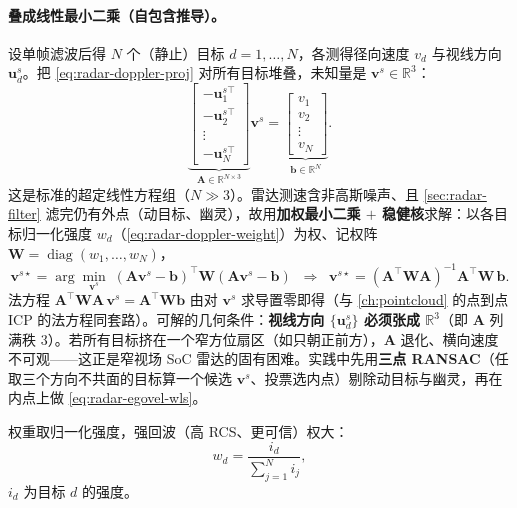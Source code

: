\paragraph{叠成线性最小二乘（自包含推导）。}
设单帧滤波后得 $N$ 个（静止）目标 $d=1,\dots,N$，各测得径向速度 $v_d$ 与视线方向 $\mathbf u_d^s$。把 \cref{eq:radar-doppler-proj} 对所有目标堆叠，未知量是 $\mathbf v^s\in\mathbb R^3$：
\begin{equation}
  \underbrace{\begin{bmatrix} -\mathbf u_1^{s\top}\\ -\mathbf u_2^{s\top}\\ \vdots\\ -\mathbf u_N^{s\top}\end{bmatrix}}_{\mathbf A\in\mathbb R^{N\times3}}\mathbf v^s
  =\underbrace{\begin{bmatrix} v_1\\ v_2\\ \vdots\\ v_N\end{bmatrix}}_{\mathbf b\in\mathbb R^{N}}.
  \label{eq:radar-egovel-stack}
\end{equation}
这是标准的超定线性方程组（$N\gg3$）。雷达测速含非高斯噪声、且 \cref{sec:radar-filter} 滤完仍有外点（动目标、幽灵），故用\textbf{加权最小二乘 $+$ 稳健核}求解：以各目标归一化强度 $w_d$（\cref{eq:radar-doppler-weight}）为权、记权阵 $\mathbf W=\operatorname{diag}(w_1,\dots,w_N)$，
\begin{equation}
  \mathbf v^{s\star}=\arg\min_{\mathbf v^s}\;(\mathbf A\mathbf v^s-\mathbf b)^\top\mathbf W(\mathbf A\mathbf v^s-\mathbf b)
   \;\;\Longrightarrow\;\;
  \mathbf v^{s\star}=(\mathbf A^\top\mathbf W\mathbf A)^{-1}\mathbf A^\top\mathbf W\,\mathbf b.
  \label{eq:radar-egovel-wls}
\end{equation}
法方程 $\mathbf A^\top\mathbf W\mathbf A\,\mathbf v^s=\mathbf A^\top\mathbf W\mathbf b$ 由对 $\mathbf v^s$ 求导置零即得（与 \cref{ch:pointcloud} 的点到点 ICP 的法方程同套路）。可解的几何条件：\textbf{视线方向 $\{\mathbf u_d^s\}$ 必须张成 $\mathbb R^3$}（即 $\mathbf A$ 列满秩 $3$）。若所有目标挤在一个窄方位扇区（如只朝正前方），$\mathbf A$ 退化、横向速度不可观——这正是窄视场 SoC 雷达的固有困难。实践中先用\textbf{三点 RANSAC}（任取三个方向不共面的目标算一个候选 $\mathbf v^s$、投票选内点）剔除动目标与幽灵，再在内点上做 \cref{eq:radar-egovel-wls}\cite{carlone2026handbook}。

权重取归一化强度，强回波（高 RCS、更可信）权大：
\begin{equation}
  w_d=\frac{i_d}{\sum_{j=1}^{N} i_j},
  \label{eq:radar-doppler-weight}
\end{equation}
$i_d$ 为目标 $d$ 的强度。

